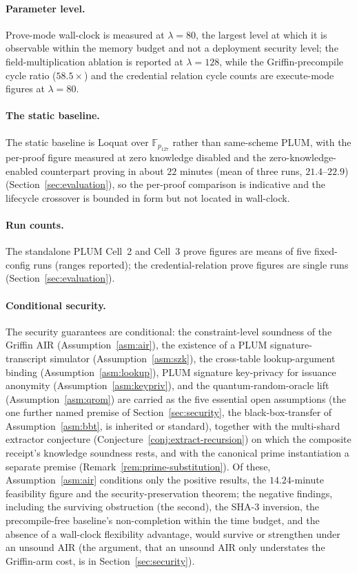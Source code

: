 \paragraph{Parameter level.}
Prove-mode wall-clock is measured at $\lambda=80$, the largest level at which it is observable within the memory budget and not a deployment security level; the field-multiplication ablation is reported at $\lambda=128$, while the Griffin-precompile cycle ratio ($58.5\times$) and the credential relation cycle counts are execute-mode figures at $\lambda=80$.

\paragraph{The static baseline.}
The static baseline is Loquat over $\mathbb{F}_{p_{127}}$ rather than same-scheme PLUM, with the per-proof figure measured at zero knowledge disabled and the zero-knowledge-enabled counterpart proving in about $22$ minutes (mean of three runs, $21.4$--$22.9$) (Section~\ref{sec:evaluation}), so the per-proof comparison is indicative and the lifecycle crossover is bounded in form but not located in wall-clock.

\paragraph{Run counts.}
The standalone PLUM Cell~2 and Cell~3 prove figures are means of five fixed-config runs (ranges reported); the credential-relation prove figures are single runs (Section~\ref{sec:evaluation}).

\paragraph{Conditional security.}
The security guarantees are conditional: the constraint-level soundness of the Griffin AIR (Assumption~\ref{asm:air}), the existence of a PLUM signature-transcript simulator (Assumption~\ref{asm:szk}), the cross-table lookup-argument binding (Assumption~\ref{asm:lookup}), PLUM signature key-privacy for issuance anonymity (Assumption~\ref{asm:keypriv}), and the quantum-random-oracle lift (Assumption~\ref{asm:qrom}) are carried as the five essential open assumptions (the one further named premise of Section~\ref{sec:security}, the black-box-transfer of Assumption~\ref{asm:bbt}, is inherited or standard), together with the multi-shard extractor conjecture (Conjecture~\ref{conj:extract-recursion}) on which the composite receipt's knowledge soundness rests, and with the canonical prime instantiation a separate premise (Remark~\ref{rem:prime-substitution}). Of these, Assumption~\ref{asm:air} conditions only the positive results, the $14.24$-minute feasibility figure and the security-preservation theorem; the negative findings, including the surviving obstruction (the second), the SHA-3 inversion, the precompile-free baseline's non-completion within the time budget, and the absence of a wall-clock flexibility advantage, would survive or strengthen under an unsound AIR (the argument, that an unsound AIR only understates the Griffin-arm cost, is in Section~\ref{sec:security}).

